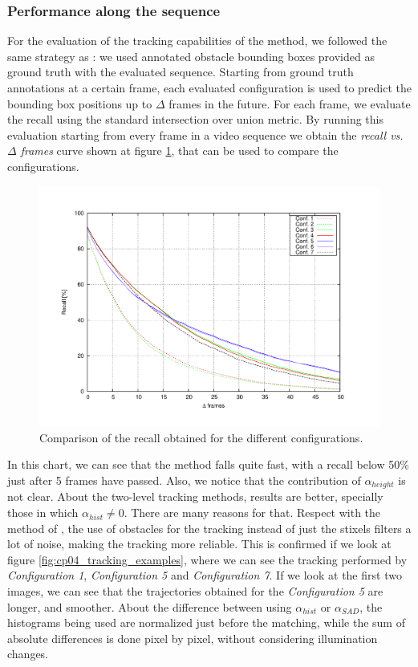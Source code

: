 \subsubsection{Performance along the sequence}\label{ch:chapter04_02_03_01}

For the evaluation of the tracking capabilities of the method, we followed the same strategy as \cite{gunyel2012stixels}: we used annotated obstacle bounding boxes provided as ground truth with the evaluated sequence. Starting from ground truth annotations at a certain frame, each evaluated configuration is used to predict the bounding box positions up to $\Delta$ frames in the future. For each frame, we evaluate the recall using the standard intersection over union metric. By running this evaluation starting from every frame in a video sequence we obtain the \emph{recall vs. $\Delta$ frames} curve shown at figure \ref{fig:cp04_recall_vs_delta_frames}, that can be used to compare the configurations. 

\begin{figure}[h!]
\centering
\includegraphics[trim=50 40 80 60,clip]{recall_vs_delta_frames}
\caption{Comparison of the recall obtained for the different configurations.}\label{fig:cp04_recall_vs_delta_frames}
\end{figure}

In this chart, we can see that the \cite{gunyel2012stixels} method falls quite fast, with a recall below 50\% just after 5 frames have passed. Also, we notice that the contribution of $\alpha_{height}$ is not clear. About the two-level tracking methods, results are better, specially those in which $\alpha_{hist} \neq 0$. There are many reasons for that. Respect with the method of \cite{gunyel2012stixels}, the use of obstacles for the tracking instead of just the stixels filters a lot of noise, making the tracking more reliable. This is confirmed if we look at figure \ref{fig:cp04_tracking_examples}, where we can see the tracking performed by \emph{Configuration 1}, \emph{Configuration 5} and \emph{Configuration 7}. If we look at the first two images, we can see that the trajectories obtained for the \emph{Configuration 5} are longer, and smoother. About the difference between using $\alpha_{hist}$ or $\alpha_{SAD}$, the histograms being used are normalized just before the matching, while the sum of absolute differences is done pixel by pixel, without considering illumination changes.

